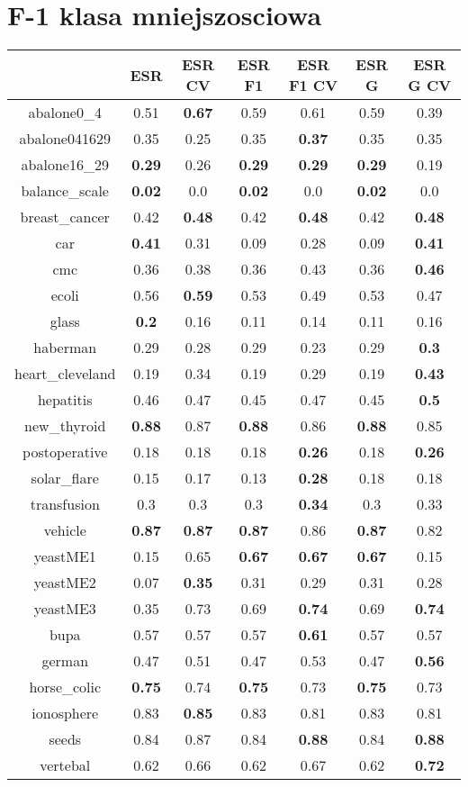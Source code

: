 \documentclass{article}%
\begin{document}
%
\section*{F{-}1 klasa mniejszosciowa}%
\begin{tabular}{c|cccccc}%
\hline%
&ESR&ESR CV&ESR F1&ESR F1 CV&ESR G&ESR G CV\\%
\hline%
abalone0\_4&0.51&\textbf{0.67}&0.59&0.61&0.59&0.39\\%
\hline%
abalone041629&0.35&0.25&0.35&\textbf{0.37}&0.35&0.35\\%
\hline%
abalone16\_29&\textbf{0.29}&0.26&\textbf{0.29}&\textbf{0.29}&\textbf{0.29}&0.19\\%
\hline%
balance\_scale&\textbf{0.02}&0.0&\textbf{0.02}&0.0&\textbf{0.02}&0.0\\%
\hline%
breast\_cancer&0.42&\textbf{0.48}&0.42&\textbf{0.48}&0.42&\textbf{0.48}\\%
\hline%
car&\textbf{0.41}&0.31&0.09&0.28&0.09&\textbf{0.41}\\%
\hline%
cmc&0.36&0.38&0.36&0.43&0.36&\textbf{0.46}\\%
\hline%
ecoli&0.56&\textbf{0.59}&0.53&0.49&0.53&0.47\\%
\hline%
glass&\textbf{0.2}&0.16&0.11&0.14&0.11&0.16\\%
\hline%
haberman&0.29&0.28&0.29&0.23&0.29&\textbf{0.3}\\%
\hline%
heart\_cleveland&0.19&0.34&0.19&0.29&0.19&\textbf{0.43}\\%
\hline%
hepatitis&0.46&0.47&0.45&0.47&0.45&\textbf{0.5}\\%
\hline%
new\_thyroid&\textbf{0.88}&0.87&\textbf{0.88}&0.86&\textbf{0.88}&0.85\\%
\hline%
postoperative&0.18&0.18&0.18&\textbf{0.26}&0.18&\textbf{0.26}\\%
\hline%
solar\_flare&0.15&0.17&0.13&\textbf{0.28}&0.18&0.18\\%
\hline%
transfusion&0.3&0.3&0.3&\textbf{0.34}&0.3&0.33\\%
\hline%
vehicle&\textbf{0.87}&\textbf{0.87}&\textbf{0.87}&0.86&\textbf{0.87}&0.82\\%
\hline%
yeastME1&0.15&0.65&\textbf{0.67}&\textbf{0.67}&\textbf{0.67}&0.15\\%
\hline%
yeastME2&0.07&\textbf{0.35}&0.31&0.29&0.31&0.28\\%
\hline%
yeastME3&0.35&0.73&0.69&\textbf{0.74}&0.69&\textbf{0.74}\\%
\hline%
bupa&0.57&0.57&0.57&\textbf{0.61}&0.57&0.57\\%
\hline%
german&0.47&0.51&0.47&0.53&0.47&\textbf{0.56}\\%
\hline%
horse\_colic&\textbf{0.75}&0.74&\textbf{0.75}&0.73&\textbf{0.75}&0.73\\%
\hline%
ionosphere&0.83&\textbf{0.85}&0.83&0.81&0.83&0.81\\%
\hline%
seeds&0.84&0.87&0.84&\textbf{0.88}&0.84&\textbf{0.88}\\%
\hline%
vertebal&0.62&0.66&0.62&0.67&0.62&\textbf{0.72}\\%
\hline%
\end{tabular}
\end{document}

